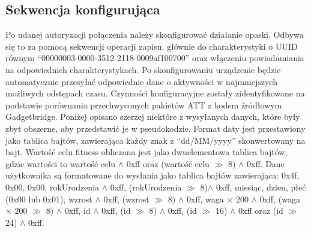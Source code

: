 \subsection{Sekwencja konfigurująca}
Po udanej autoryzacji połączenia należy skonfigurować działanie opaski. Odbywa się to za pomocą sekwencji operacji zapisu, głównie do charakterystyki o UUID równym ``00000003-0000-3512-2118-0009af100700'' oraz włączeniu powiadamiania na odpowiednich charakterystykach. Po skonfigurowaniu urządzenie będzie automatycznie przesyłać odpowiednie dane o aktywności w najmniejszych możliwych odstępach czasu. Czynności konfiguracyjne zostały zidentyfikowane na podstawie porównania przechwyconych pakietów ATT z kodem źródłowym Gadgetbridge. Poniżej opisano szerzej niektóre z wysyłanych danych, które były zbyt obszerne, aby przedstawić je w pseudokodzie. 
\newline\newline
\indent Format daty jest przestawiony jako tablica bajtów, zawierająca każdy znak z ``dd/MM/yyyy'' skonwertowany na bajt. Wartość celu fitness obliczana jest jako dwuelementowa tablica bajtów, gdzie wartości to wartość celu $\land$ 0xff oraz (wartość celu $\gg$ 8) $\land$ 0xff. Dane użytkownika są formatowane do wysłania jako tablica bajtów zawierająca: 0x4f, 0x00, 0x00, rokUrodzenia $\land$ 0xff, (rokUrodzenia $\gg$ 8)$\land$ 0xff, miesiąc, dzien, płeć (0x00 lub 0x01), wzrost $\land$ 0xff, (wzrost $\gg$ 8) $\land$ 0xff, waga $\times$ 200 $\land$ 0xff, (waga $\times$ 200 $\gg$ 8) $\land$ 0xff, id $\land$ 0xff, (id $\gg$ 8) $\land$ 0xff, (id $\gg$ 16) $\land$ 0xff oraz (id $\gg$ 24) $\land$ 0xff.
\newline\newline
